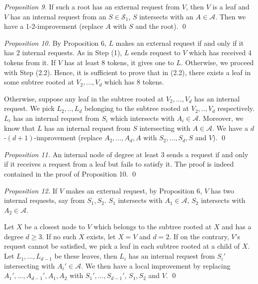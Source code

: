 \documentclass[runningheads,a4paper]{llncs}
\numberwithin{equation}{section}
\begin{document}
\begin{proof}[Proposition 9]
If such a root has an external request from $V$, then $V$ is a leaf and $V$ has an internal request from an $S\in\mathscr{S}_1$, $S$ intersects with an $A\in\mathscr{A}$. Then we have a 1-2-improvement (replace $A$ with $S$ and the root). \qed
\end{proof}


\begin{proof}[Proposition 10]
By Proposition 6, $L$ makes an external request if and only if it has 2 internal requests. As in Step (1), $L$ sends request to $V$ which has received 4 tokens from it. If $V$ has at least 8 tokens, it gives one to $L$. Otherwise, we proceed with Step (2.2). Hence, it is sufficient to prove that in (2.2), there exists a leaf in some subtree rooted at $V_2,...,V_d$ which has 8 tokens.

Otherwise, suppose any leaf in the subtree rooted at $V_2,...,V_d$ has an internal request. We pick $L_2,..,L_d$ belonging to the subtree rooted at $V_2,..,V_d$ respectively. $L_i$ has an internal request from $S_i$ which intersects with $A_i\in\mathscr{A}$. Moreover, we know that $L$ has an internal request from $S$ intersecting with $A\in\mathscr{A}$. We have a $d$-$(d+1)$-improvement (replace $A_2,...,A_d,A$ with $S_2,...,S_d,S$ and $V$). \qed
\end{proof}

\begin{proof}[Proposition 11]
An internal node of degree at least 3 sends a request if and only if it receives a request from a leaf but fails to satisfy it. The proof is indeed contained in the proof of Proposition 10. \qed
\end{proof}


\begin{proof}[Proposition 12]
If $V$ makes an external request, by Proposition 6, $V$ has two internal requests, say from $S_1,S_2$. $S_1$ intersects with $A_1\in\mathscr{A}$, $S_2$ intersects with $A_2\in\mathscr{A}$.

Let $X$ be a closest node to $V$ which belongs to the subtree rooted at $X$ and has a degree $d\geq 3$. If no such $X$ exists, let $X=V$ and $d=2$. If on the contrary, $V$'s request cannot be satisfied, we pick a leaf in each subtree rooted at a child of $X$. Let $L_1,...,L_{d-1}$ be these leaves, then $L_i$ has an internal request from $S_i'$ intersecting with $A_i'\in\mathscr{A}$. We then have a local improvement by replacing $A_1',...,A_{d-1}',A_1,A_2$ with $S_1',...,S_{d-1}'$, $S_1,S_2$ and $V$. \qed
\end{proof}
\end{document}

